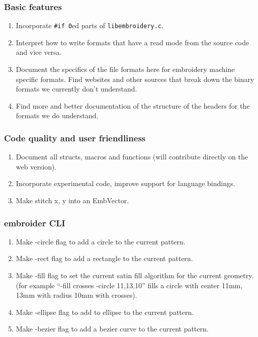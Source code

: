 \documentclass[a4paper, 11pt]{report}
\begin{document}
\subsubsection{Basic features}

\begin{enumerate}
\item Incorporate \texttt{\#if 0}ed parts of \texttt{libembroidery.c}.
\item Interpret how to write formats that have a read mode from the source code and vice versa.
\item Document the specifics of the file formats here for embroidery machine specific formats. Find websites and other sources that break down the binary formats we currently don't understand.
\item Find more and better documentation of the structure of the headers for the formats we do understand.
\end{enumerate}

\subsubsection{Code quality and user friendliness}

\begin{enumerate}
\item Document all structs, macros and functions (will contribute directly
   on the web version).
\item Incorporate experimental code, improve support for language bindings.
\item Make stitch x, y into an EmbVector.
\end{enumerate}

\subsubsection{embroider CLI}

\begin{enumerate}
\item Make -circle flag to add a circle to the current pattern.
\item Make -rect flag to add a rectangle to the current pattern.
\item Make -fill flag to set the current satin fill algorithm for the current geometry. (for example ``-fill crosses -circle 11,13,10'' fills a circle with center 11mm, 13mm with radius 10mm with crosses).
\item Make -ellipse flag to add to ellipse to the current pattern.
\item Make -bezier flag to add a bezier curve to the current pattern.
\end{enumerate}
\end{document}
